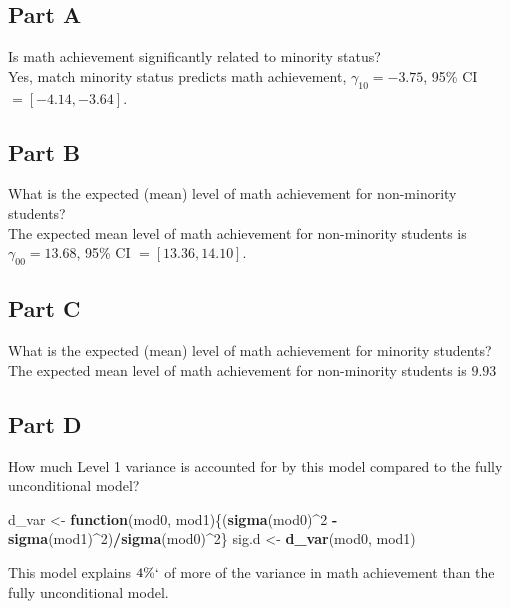 \documentclass[]{article}
\newenvironment{Shaded}{\begin{snugshade}}{\end{snugshade}}
\newcommand{\KeywordTok}[1]{\textcolor[rgb]{0.13,0.29,0.53}{\textbf{#1}}}
\newcommand{\DecValTok}[1]{\textcolor[rgb]{0.00,0.00,0.81}{#1}}
\newcommand{\StringTok}[1]{\textcolor[rgb]{0.31,0.60,0.02}{#1}}
\newcommand{\ControlFlowTok}[1]{\textcolor[rgb]{0.13,0.29,0.53}{\textbf{#1}}}
\newcommand{\OperatorTok}[1]{\textcolor[rgb]{0.81,0.36,0.00}{\textbf{#1}}}
\newcommand{\NormalTok}[1]{#1}
\begin{document}
\subsection{Part A}\label{part-a}

Is math achievement significantly related to minority status?\\
Yes, match minority status predicts math achievement,
\(\gamma_{10} = -3.75\), 95\% CI \(= [-4.14, -3.64]\).

\subsection{Part B}\label{part-b}

What is the expected (mean) level of math achievement for non-minority
students?\\
The expected mean level of math achievement for non-minority students is
\(\gamma_{00} = 13.68\), 95\% CI \(= [13.36, 14.10]\).

\subsection{Part C}\label{part-c}

What is the expected (mean) level of math achievement for minority
students?\\
The expected mean level of math achievement for non-minority students is
\(9.93\)

\subsection{Part D}\label{part-d}

How much Level 1 variance is accounted for by this model compared to the
fully unconditional model?

\begin{Shaded}
\begin{Highlighting}[]
\NormalTok{d_var <-}\StringTok{ }\ControlFlowTok{function}\NormalTok{(mod0, mod1)\{(}\KeywordTok{sigma}\NormalTok{(mod0)}\OperatorTok{^}\DecValTok{2} \OperatorTok{-}\StringTok{ }\KeywordTok{sigma}\NormalTok{(mod1)}\OperatorTok{^}\DecValTok{2}\NormalTok{)}\OperatorTok{/}\KeywordTok{sigma}\NormalTok{(mod0)}\OperatorTok{^}\DecValTok{2}\NormalTok{\}}
\NormalTok{sig.d <-}\StringTok{ }\KeywordTok{d_var}\NormalTok{(mod0, mod1)}
\end{Highlighting}
\end{Shaded}

This model explains \(4\%`\) of more of the variance in math achievement
than the fully unconditional model.
\end{document}
